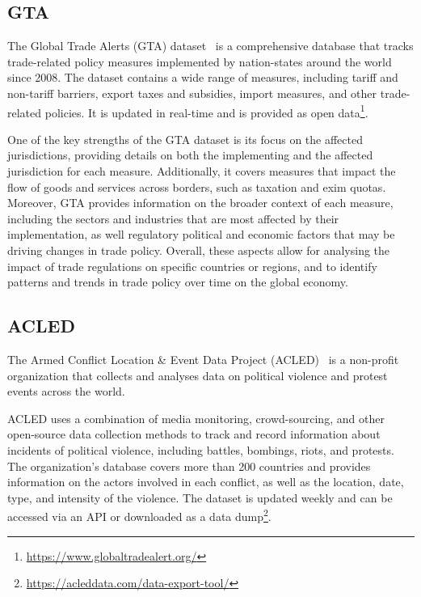 \subsection{GTA}
The Global Trade Alerts (GTA) dataset~\cite{gta_paper} is a comprehensive database that tracks trade-related policy measures implemented by nation-states around the world since 2008. The dataset contains a wide range of measures, including tariff and non-tariff barriers, export taxes and subsidies, import measures, and other trade-related policies.
It is updated in real-time and is provided as open data\footnote{\url{https://www.globaltradealert.org/}}. 

One of the key strengths of the GTA dataset is its focus on the affected jurisdictions, providing details on both the implementing and the affected jurisdiction for each measure. Additionally, it covers measures that impact the flow of goods and services across borders, such as taxation and exim quotas. Moreover, GTA provides information on the broader context of each measure, including the sectors and industries that are most affected by their implementation, as well regulatory political and economic factors that may be driving changes in trade policy. Overall, these aspects allow for analysing the impact of trade regulations on specific countries or regions, and to identify patterns and trends in trade policy over time on the global economy.

\subsection{ACLED}
The Armed Conflict Location \& Event Data Project (ACLED)~\cite{acled_paper} is a non-profit organization that collects and analyses data on political violence and protest events across the world.

ACLED uses a combination of media monitoring, crowd-sourcing, and other open-source data collection methods to track and record information about incidents of political violence, including battles, bombings, riots, and protests. The organization's database covers more than 200 countries and provides information on the actors involved in each conflict, as well as the location, date, type, and intensity of the violence. The dataset is updated weekly and can be accessed via an API or downloaded as a data dump\footnote{\url{https://acleddata.com/data-export-tool/}}.

